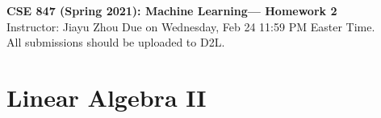 \documentclass[11pt]{article}
\begin{document}
\thispagestyle {empty}

\newcommand{\lsp}[1]{\large\renewcommand{\baselinestretch}{#1}\normalsize}
\newcommand{\hsp}{\hspace{.2in}}
\newcommand{\comment}[1]{}
\newtheorem{thm}{Theorem}[section]
\newtheorem{lem}{Lemma}[section]
\newtheorem{cor}{Corollary}[section]
\newtheorem{prop}{Proposition}[section]
\newtheorem{problem}{Problem}[section]

\newcommand{\R}{{\rm\hbox{I\kern-.15em R}}}
\newcommand{\IR}{{\rm\hbox{I\kern-.15em R}}}
\newcommand{\IN}{{\rm\hbox{I\kern-.15em N}}}
\newcommand{\IZ}{{\sf\hbox{Z\kern-.40em Z}}}
\newcommand{\IS}{{\rm\hbox{S\kern-.45em S}}}
\newcommand{\Real}{I\!\!R}

\newcommand{\bPhi}{\bm{\Phi}}
\newcommand{\bphi}{\bm{\phi}}
\newcommand{\bt}{\mathbf{t}}
\newcommand{\bw}{\mathbf{w}}
\newcommand{\bx}{\mathbf{x}}
\newcommand{\by}{\mathbf{y}}
\newcommand{\bX}{\mathbf{X}}
\newcommand{\bmm}{\mathbf{m}}
\newcommand{\bS}{\mathbf{S}}
\newcommand{\bL}{\mathbf{L}}
\newcommand{\bM}{\mathbf{M}}

\newcommand{\linesep}{\vspace{.2cm}\hrule\vspace{0.2cm}}
\newcommand{\categorysep}{\vspace{0.5cm}}
\newcommand{\entrysep}{\vspace{0cm}}

\newcommand{\category}[1]{\categorysep
                  \noindent {\bf \large #1}
              \linesep}

\pagestyle{empty}

\begin{center}
{\large \textbf{CSE 847 (Spring 2021): Machine Learning--- Homework 2}} \\
 Instructor: Jiayu Zhou \quad
 Due on Wednesday, Feb 24 11:59 PM Easter Time. \\
 All submissions should be uploaded to D2L.
\end{center}

\section{Linear Algebra II}
\end{document}
